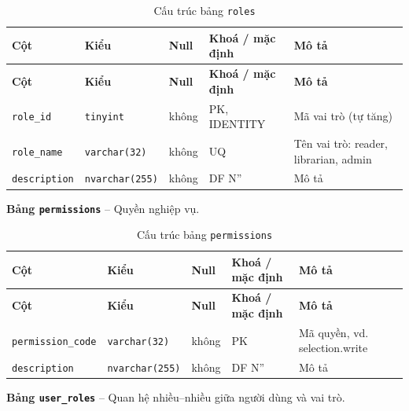 \setlength{\tabcolsep}{4pt}
\begin{longtable}{>{\raggedright\arraybackslash}p{}>{\raggedright\arraybackslash}p{}>{\centering\arraybackslash}p{}>{\raggedright\arraybackslash}p{}>{\raggedright\arraybackslash}p{}}
\caption{Cấu trúc bảng \texttt{roles}}\label{tab:col_roles}\\
\toprule \textbf{Cột} & \textbf{Kiểu} & \textbf{Null} & \textbf{Khoá / mặc định} & \textbf{Mô tả} \\ \midrule \endfirsthead
\toprule \textbf{Cột} & \textbf{Kiểu} & \textbf{Null} & \textbf{Khoá / mặc định} & \textbf{Mô tả} \\ \midrule \endhead
\bottomrule \endfoot
\texttt{role\_id} & {\footnotesize\texttt{tinyint}} & không & PK, IDENTITY & Mã vai trò (tự tăng) \\
\texttt{role\_name} & {\footnotesize\texttt{varchar(32)}} & không & UQ & Tên vai trò: reader, librarian, admin \\
\texttt{description} & {\footnotesize\texttt{nvarchar(255)}} & không & DF N'' & Mô tả \\
\end{longtable}

\textbf{Bảng \texttt{permissions}} -- Quyền nghiệp vụ.

\setlength{\tabcolsep}{4pt}
\begin{longtable}{>{\raggedright\arraybackslash}p{}>{\raggedright\arraybackslash}p{}>{\centering\arraybackslash}p{}>{\raggedright\arraybackslash}p{}>{\raggedright\arraybackslash}p{}}
\caption{Cấu trúc bảng \texttt{permissions}}\label{tab:col_permissions}\\
\toprule \textbf{Cột} & \textbf{Kiểu} & \textbf{Null} & \textbf{Khoá / mặc định} & \textbf{Mô tả} \\ \midrule \endfirsthead
\toprule \textbf{Cột} & \textbf{Kiểu} & \textbf{Null} & \textbf{Khoá / mặc định} & \textbf{Mô tả} \\ \midrule \endhead
\bottomrule \endfoot
\texttt{permission\_code} & {\footnotesize\texttt{varchar(32)}} & không & PK & Mã quyền, vd. selection.write \\
\texttt{description} & {\footnotesize\texttt{nvarchar(255)}} & không & DF N'' & Mô tả \\
\end{longtable}

\textbf{Bảng \texttt{user\_roles}} -- Quan hệ nhiều--nhiều giữa người dùng và vai trò.

